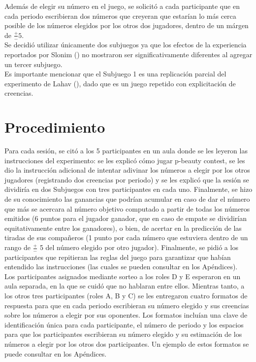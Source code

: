 Además de elegir su número en el juego, se solicitó a cada participante que en cada periodo escribieran dos números que creyeran que estarían lo más cerca posible de los números elegidos por los otros dos jugadores, dentro de un márgen de $\frac{+}{-}5$.\\

Se decidió utilizar únicamente dos subjuegos ya que los efectos de la experiencia reportados por Slonim (\citeyear{Slonim}) no mostraron ser significativamente diferentes al agregar un tercer subjuego.\\

Es importante mencionar que el Subjuego 1 es una replicación parcial del experimento de Lahav (\citeyear{Lahav}), dado que es un juego repetido con explicitación de creencias.\\

\section{Procedimiento}

Para cada sesión, se citó a los 5 participantes en un aula donde se les leyeron las instrucciones del experimento: se les explicó cómo jugar p-beauty contest, se les dio la instrucción adicional de intentar adivinar los números a elegir por los otros jugadores (registrando dos creencias por periodo) y se les explicó que la sesión se dividiría en dos Subjuegos con tres participantes en cada uno. Finalmente, se hizo de su conocimiento las ganancias que podrían acumular en caso de dar el número que más se acercara al número objetivo computado a partir de todas los números emitidos (6 puntos para el jugador ganador, que en caso de empate se dividirían equitativamente entre los ganadores), o bien, de acertar en la predicción de las tiradas de sus compañeros (1 punto por cada número que estuviera dentro de un rango de $\frac{+}{-}$ 5 del número elegido por otro jugador). Finalmente, se pidió a los participantes que repitieran las reglas del juego para garantizar que habían entendido las instrucciones (las cuales se pueden consultar en los Apéndices).\\

Los participantes asignados mediante sorteo a los roles D y E esperaron en un aula separada, en la que se cuidó que no hablaran entre ellos. Mientras tanto, a los otros tres participantes (roles A, B y C) se les entregaron cuatro formatos de respuesta para que en cada periodo escribieran su número elegido y sus creencias sobre los números a elegir por sus oponentes. Los formatos incluían una clave de identificación única para cada participante, el número de periodo y los espacios para que los participantes escribieran su número elegido y su estimación de los números a elegir por los otros dos participantes. Un ejemplo de estos formatos se puede consultar en los Apéndices.\\

